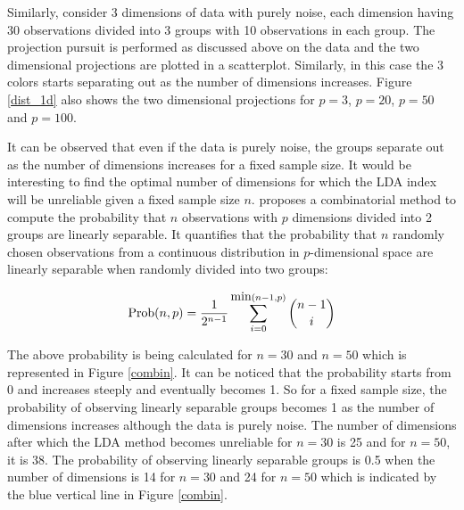 Similarly, consider 3 dimensions of data with purely noise, each dimension having 30 observations divided into 3 groups with 10 observations in each group. The projection pursuit is performed as discussed above on the data and the two dimensional projections are plotted in a scatterplot. Similarly, in this case the 3 colors starts separating out as the number of dimensions increases.  Figure \ref{dist_1d} also shows the two dimensional projections for $p=3$, $p=20$, $p=50$ and $p=100$.

It can be observed that even if the data is purely noise, the groups separate out as the number of dimensions increases for a fixed sample size. It would be interesting to find the optimal number of dimensions for which the LDA index will be unreliable given a fixed sample size $n$. \cite{ripley:1996} proposes a combinatorial method to compute the probability that $n$ observations with $p$ dimensions divided into 2 groups are linearly separable. It quantifies that the probability that $n$ randomly chosen observations from a continuous distribution in $p$-dimensional space are linearly separable when randomly divided into two groups:

$$\hbox{Prob}(n, p) = \frac{1}{2^{n - 1}} \sum_{i = 0}^{\hbox{min}(n - 1, p)}{n - 1\choose i}$$

The above probability is being calculated for $n = 30$ and $n = 50$ which is represented in Figure \ref{combin}.  It can be noticed that the probability starts from 0 and increases steeply and eventually becomes 1. So for a fixed sample size, the probability of observing linearly separable groups becomes 1 as the number of dimensions increases although the data is purely noise. The number of dimensions after which the LDA method becomes unreliable for $n = 30$ is 25 and for $n = 50$, it is 38. The probability of observing linearly separable groups is 0.5 when the number of dimensions is 14 for $n = 30$ and 24 for $n = 50$ which is indicated by the blue vertical line in Figure \ref{combin}. 

